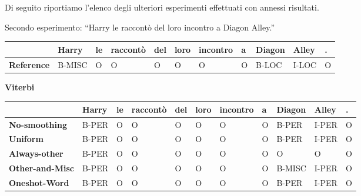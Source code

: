 \documentclass[a4paper,11pt,notitlepage]{report}
\begin{document}
Di seguito riportiamo l'elenco degli ulteriori esperimenti effettuati con annessi risultati.

Secondo esperimento: ``Harry le raccontò del loro incontro a Diagon Alley.''

\begin{center}
\scriptsize
\setlength{\tabcolsep}{3pt}
\begin{tabular}{|l|l|l|l|l|l|l|l|l|l|l|}
\hline
\textbf{} & \textbf{Harry} & \textbf{le} & \textbf{raccontò} & \textbf{del} & \textbf{loro} & \textbf{incontro} & \textbf{a} & \textbf{Diagon} & \textbf{Alley} & \textbf{.} \\ \hline
\textbf{Reference} & B-MISC & O & O & O & O & O & O & B-LOC & I-LOC & O \\ \hline
\end{tabular}
\end{center}

\begin{center}\textbf{Viterbi}\end{center}
\begin{center}
\scriptsize
\setlength{\tabcolsep}{3pt}
\begin{tabular}{|l|l|l|l|l|l|l|l|l|l|l|}
\hline
\textbf{} & \textbf{Harry} & \textbf{le} & \textbf{raccontò} & \textbf{del} & \textbf{loro} & \textbf{incontro} & \textbf{a} & \textbf{Diagon} & \textbf{Alley} & \textbf{.} \\ \hline
\textbf{No-smoothing} & B-PER & O & O & O & O & O & O & B-PER & I-PER & O \\ \hline
\textbf{Uniform} & B-PER & O & O & O & O & O & O & B-PER & I-PER & O \\ \hline
\textbf{Always-other} & B-PER & O & O & O & O & O & O & O & O & O \\ \hline
\textbf{Other-and-Misc} & B-PER & O & O & O & O & O & O & B-MISC & I-PER & O \\ \hline
\textbf{Oneshot-Word} & B-PER & O & O & O & O & O & O & B-PER & I-PER & O \\ \hline
\end{tabular}
\end{center}
\end{document}
